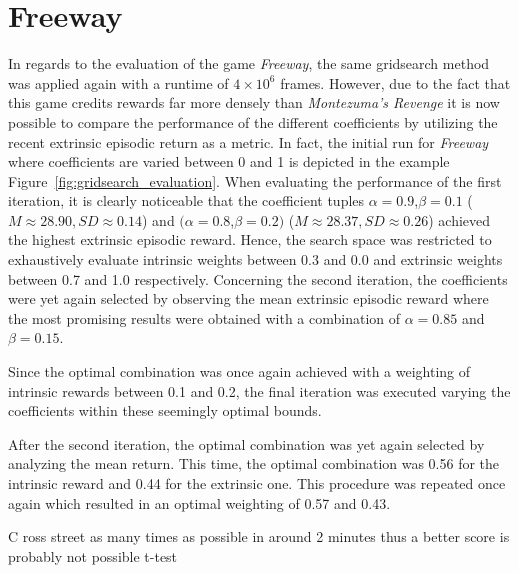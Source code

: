 \documentclass[draft,final]{vutinfth} %
\begin{document}
    \section{Freeway}
    In regards to the evaluation of the game \textit{Freeway}, the same gridsearch method was applied again with a runtime of $4\times10^6$ frames.
    However, due to the fact that this game credits rewards far more densely than \textit{Montezuma's Revenge} it is now possible to compare the performance of the different coefficients by utilizing the recent extrinsic episodic return as a metric.
    In fact, the initial run for \textit{Freeway} where coefficients are varied between 0 and 1 is depicted in the example Figure~\ref{fig:gridsearch_evaluation}.
    When evaluating the performance of the first iteration, it is clearly noticeable that the coefficient tuples $\alpha=0.9$,$\beta=0.1$ ($M\approx28.90,SD\approx0.14$) and $(\alpha=0.8$,$\beta=0.2)$ ($M\approx28.37,SD\approx0.26$) achieved the highest extrinsic episodic reward.
    Hence, the search space was restricted to exhaustively evaluate intrinsic weights between 0.3 and 0.0 and extrinsic weights between 0.7 and 1.0 respectively.
    Concerning the second iteration, the coefficients were yet again selected by observing the mean extrinsic episodic reward where the most promising results were obtained with a combination of $\alpha=0.85$ and $\beta=0.15$.

    Since the optimal combination was once again achieved with a weighting of intrinsic rewards between 0.1 and 0.2, the final iteration was executed varying the coefficients within these seemingly optimal bounds.

    After the second iteration, the optimal combination was yet again selected by analyzing the mean return.
    This time, the optimal combination was 0.56 for the intrinsic reward and 0.44 for the extrinsic one.
    This procedure was repeated once again which resulted in an optimal weighting of 0.57 and 0.43.


    C ross street as many times as possible in around 2 minutes thus a better score is probably not possible
    t-test
\end{document}
